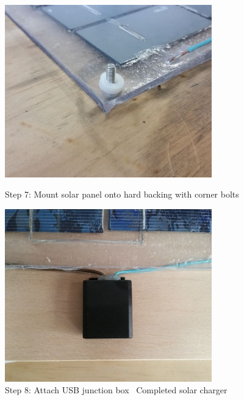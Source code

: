 \documentclass{article}
\theoremstyle{definition}
\theoremstyle{definition}
\theoremstyle{remark}
\begin{document}
  \begin{figure}[!ht]
    \begin{minipage}{0.25\textwidth}
        \centering
        \includegraphics[width=0.8\textwidth]{../Images/image_3_10_(step_7).png}
        \caption*{Step 7: Mount solar panel onto hard backing with corner bolts}
    \end{minipage}\hfill
    \begin{minipage}{0.25\textwidth}
        \centering
        \includegraphics[width=0.8\textwidth]{../Images/image_3_11_(step_8).png}
        \caption*{Step 8: Attach USB junction box  Completed solar charger}
    \end{minipage}\hfill
    \begin{minipage}{0.25\textwidth}
        \centering

\end{minipage}
\end{figure}
\end{document}

